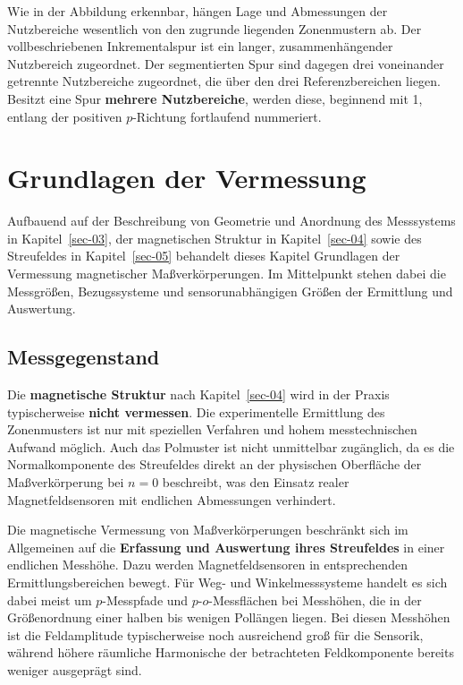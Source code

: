 \documentclass[
  ngerman,
  a4paper,
  twoside]{scrbook}
\begin{document}
Wie in der Abbildung erkennbar, hängen Lage und Abmessungen der
Nutzbereiche wesentlich von den zugrunde liegenden Zonenmustern ab. Der
vollbeschriebenen Inkrementalspur ist ein langer, zusammenhängender
Nutzbereich zugeordnet. Der segmentierten Spur sind dagegen drei
voneinander getrennte Nutzbereiche zugeordnet, die über den drei
Referenzbereichen liegen. Besitzt eine Spur \textbf{mehrere
Nutzbereiche}, werden diese, beginnend mit 1, entlang der positiven
\(p\)-Richtung fortlaufend nummeriert.


\chapter{Grundlagen der Vermessung}\label{sec-06}

Aufbauend auf der Beschreibung von Geometrie und Anordnung des
Messsystems in Kapitel~\ref{sec-03}, der magnetischen Struktur in
Kapitel~\ref{sec-04} sowie des Streufeldes in Kapitel~\ref{sec-05}
behandelt dieses Kapitel Grundlagen der Vermessung magnetischer
Maßverkörperungen. Im Mittelpunkt stehen dabei die Messgrößen,
Bezugssysteme und sensorunabhängigen Größen der Ermittlung und
Auswertung.

\section{Messgegenstand}\label{sec-06-messgegenstand}

Die \textbf{magnetische Struktur} nach Kapitel~\ref{sec-04} wird in der
Praxis typischerweise \textbf{nicht vermessen}. Die experimentelle
Ermittlung des Zonenmusters ist nur mit speziellen Verfahren und hohem
messtechnischen Aufwand möglich. Auch das Polmuster ist nicht
unmittelbar zugänglich, da es die Normalkomponente des Streufeldes
direkt an der physischen Oberfläche der Maßverkörperung bei \(n = 0\)
beschreibt, was den Einsatz realer Magnetfeldsensoren mit endlichen
Abmessungen verhindert.

Die magnetische Vermessung von Maßverkörperungen beschränkt sich im
Allgemeinen auf die \textbf{Erfassung und Auswertung ihres Streufeldes}
in einer endlichen Messhöhe. Dazu werden Magnetfeldsensoren in
entsprechenden Ermittlungsbereichen bewegt. Für Weg- und
Winkelmesssysteme handelt es sich dabei meist um \(p\)-Messpfade und
\(p\)-\(o\)-Messflächen bei Messhöhen, die in der Größenordnung einer
halben bis wenigen Pollängen liegen. Bei diesen Messhöhen ist die
Feldamplitude typischerweise noch ausreichend groß für die Sensorik,
während höhere räumliche Harmonische der betrachteten Feldkomponente
bereits weniger ausgeprägt sind.
\end{document}
